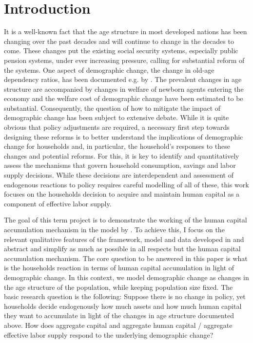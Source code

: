 \section{Introduction} %
\label{sec:introduction}

It is a well-known fact that the age structure in most developed nations has been changing over the past decades and will continue to change in the decades to come. These changes put the existing social security systems, especially public pension systems, under ever increasing pressure, calling for substantial reform of the systems. One aspect of demographic change, the change in old-age dependency ratios, has been documented e.g. by \cite{LudwigSchelkleVogel2012}. The prevalent changes in age structure are accompanied by changes in welfare of newborn agents entering the economy and the welfare cost of demographic change have been estimated to be substantial. Consequently, the question of how to mitigate the impact of demographic change has been subject to extensive debate. While it is quite obvious that policy adjustments are required, a necessary first step towards designing these reforms is to better understand the implications of demographic change for households and, in particular, the household's responses to these changes and potential reforms. For this, it is key to identify and quantitatively assess the mechanisms that govern household consumption, savings and labor supply decisions. While these decisions are interdependent and assessment of endogenous reactions to policy requires careful modelling of all of these, this work focuses on the households decision to acquire and maintain human capital as a component of effective labor supply.

The goal of this term project is to demonstrate the working of the human capital accumulation mechanism in the model by \cite{LudwigSchelkleVogel2012}. To achieve this, I focus on the relevant qualitative features of the framework, model and data developed in \cite{LudwigSchelkleVogel2012} and abstract and simplify as much as possible in all respects but the human capital accumulation mechanism. The core question to be answered in this paper is what is the households reaction in terms of human capital accumulation in light of demographic change. In this context, we model demographic change as changes in the age structure of the population, while keeping population size fixed. The basic research question is the following: Suppose there is no change in policy, yet households decide endogenously how much assets and how much human capital they want to accumulate in light of the changes in age structure documented above. How does aggregate capital and aggregate human capital / aggregate effective labor supply respond to the underlying demographic change?

